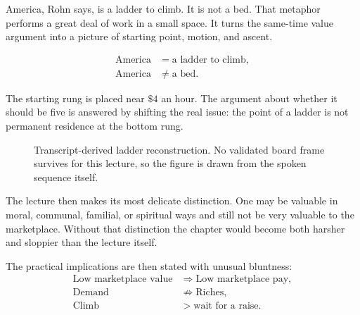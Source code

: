 America, Rohn says, is a ladder to climb. It is not a bed. That metaphor performs a great deal of work in a small space. It turns the same-time value argument into a picture of starting point, motion, and ascent.

\begin{align}
\text{America} &= \text{a ladder to climb},\\
\text{America} &\neq \text{a bed}.
\end{align}

The starting rung is placed near \(\$4\) an hour. The argument about whether it should be five is answered by shifting the real issue: the point of a ladder is not permanent residence at the bottom rung.

\begin{figure}[h]
\centering
{}
\caption{Transcript-derived ladder reconstruction. No validated board frame survives for this lecture, so the figure is drawn from the spoken sequence itself.}
\end{figure}

The lecture then makes its most delicate distinction. One may be valuable in moral, communal, familial, or spiritual ways and still not be very valuable to the marketplace. Without that distinction the chapter would become both harsher and sloppier than the lecture itself.

The practical implications are then stated with unusual bluntness:
\begin{align}
\text{Low marketplace value} &\Longrightarrow \text{Low marketplace pay},\\
\text{Demand} &\not\Longrightarrow \text{Riches},\\
\text{Climb} &> \text{wait for a raise}.
\end{align}

